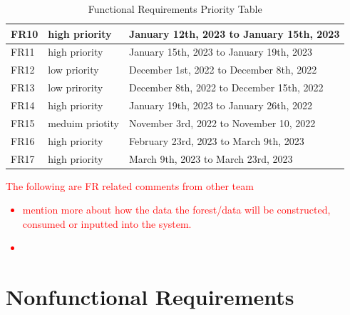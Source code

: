 \documentclass{article}
\begin{document}
\begin{table}[H]
\begin{tabular}{|lll|}
\multicolumn{1}{|l|}{FR10}                                                              & \multicolumn{1}{l|}{high priority}   & January 12th, 2023 to January 15th, 2023   \\ \hline
\multicolumn{1}{|l|}{FR11}                                                              & \multicolumn{1}{l|}{high priority}   & January 15th, 2023 to January 19th, 2023   \\ \hline
\multicolumn{1}{|l|}{FR12}                                                              & \multicolumn{1}{l|}{low priority}    & December 1st, 2022 to December 8th, 2022   \\ \hline
\multicolumn{1}{|l|}{FR13}                                                              & \multicolumn{1}{l|}{low prirority}   & December 8th, 2022 to December 15th, 2022  \\ \hline
\multicolumn{1}{|l|}{FR14}                                                              & \multicolumn{1}{l|}{high priority}   & January 19th, 2023 to January 26th, 2022   \\ \hline
\multicolumn{1}{|l|}{FR15}                                                              & \multicolumn{1}{l|}{meduim priotity} & November 3rd, 2022 to November 10, 2022    \\ \hline
\multicolumn{1}{|l|}{FR16}                                                              & \multicolumn{1}{l|}{high priority}   & February 23rd, 2023 to March 9th, 2023     \\ \hline
\multicolumn{1}{|l|}{FR17}                                                              & \multicolumn{1}{l|}{high priority}   & March 9th, 2023 to March 23rd, 2023        \\ \hline
\end{tabular}
\caption{Functional Requirements Priority Table}
\end{table}

\textcolor{red}{
The following are FR related comments from other team
\begin{itemize}
\item mention more about how the data the forest/data will be constructed, consumed or inputted
into the system.
\item 
\end{itemize} 
}




\section{Nonfunctional Requirements}
\end{document}
